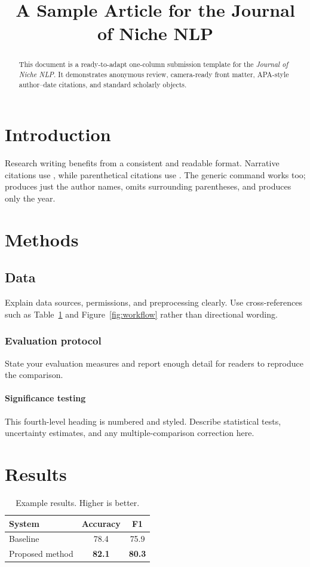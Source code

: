 \documentclass[review]{journalofnichenlp}
\title{A Sample Article for the Journal of Niche NLP}
\begin{document}
\maketitle

\begin{abstract}
This document is a ready-to-adapt one-column submission template for the \textit{Journal of Niche NLP}. It demonstrates anonymous review, camera-ready front matter, APA-style author--date citations, and standard scholarly objects.
\end{abstract}

\section{Introduction}
Research writing benefits from a consistent and readable format. Narrative citations use \citet{uralicnlp_2019}, while parenthetical citations use \citep{bird2009}. The generic command \cite{jurafsky2024} works too; \citeauthor{manning1999} produces just the author names, \citealt{manning1999} omits surrounding parentheses, and \citeyear{bird2009} produces only the year.

\section{Methods}
\subsection{Data}
Explain data sources, permissions, and preprocessing clearly. Use cross-references such as Table~\ref{tab:results} and Figure~\ref{fig:workflow} rather than directional wording.

\subsubsection{Evaluation protocol}
State your evaluation measures and report enough detail for readers to reproduce the comparison.

\paragraph{Significance testing}
This fourth-level heading is numbered and styled. Describe statistical tests, uncertainty estimates, and any multiple-comparison correction here.

\section{Results}
\begin{table}[htbp]
  \centering
  \begin{tabular}{lcc}
    \toprule
    System & Accuracy & F1 \\
    \midrule
    Baseline & 78.4 & 75.9 \\
    Proposed method & \textbf{82.1} & \textbf{80.3} \\
    \bottomrule
  \end{tabular}
  \caption{Example results. Higher is better.}
  \label{tab:results}
\end{table}
\end{document}
